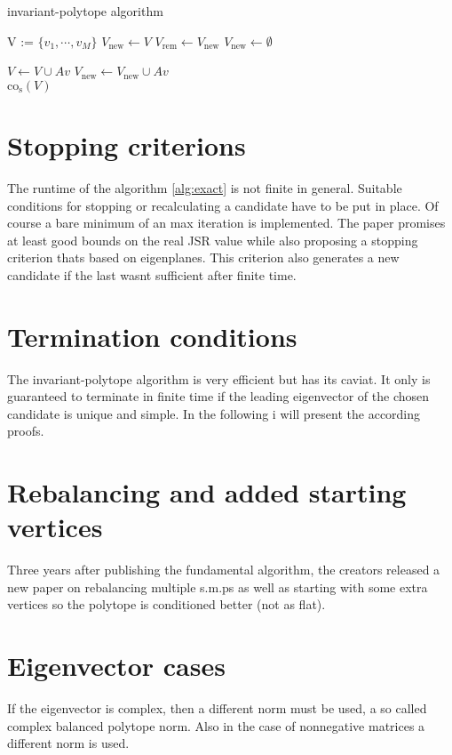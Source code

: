 \vspace{1cm}

\FloatBarrier

\begin{algorithm}
\caption{invariant-polytope algorithm}
\label{alg:exact}
\begin{algorithmic}

\State V := $\{v_1, \cdots, v_M\}$
\State $V_{\text{new}} \gets V$
\State $V_{\text{rem}} \gets V_{\text{new}}$
\State $V_{\text{new}} \gets \emptyset$

\State $V \gets V \cup Av$
\State $V_{\text{new}} \gets V_{\text{new}} \cup Av$
\EndIf
\EndFor
\EndFor
\EndWhile \\
\Return $\text{co}_{\text{s}}(V)$ \\
\end{algorithmic} 
\end{algorithm}

\FloatBarrier

\vspace{2cm}

\section{Stopping criterions}
The runtime of the algorithm \ref{alg:exact} is not finite in general. 
Suitable conditions for stopping or recalculating a candidate have to be put in place. 
Of course a bare minimum of an max iteration is implemented. 
The paper \citep{guglielmiExactComputationJoint2013} promises at least good bounds on the real JSR value while also proposing a stopping criterion thats based on eigenplanes. This criterion also generates a new candidate if the last wasnt sufficient after finite time.

\section{Termination conditions}
The invariant-polytope algorithm is very efficient but has its caviat. It only is guaranteed to terminate in finite time if the leading eigenvector of the chosen candidate is unique and simple. 
In the following i will present the according proofs. 

\section{Rebalancing and added starting vertices}
Three years after publishing the fundamental algorithm, the creators released a new paper on rebalancing multiple s.m.ps as well as starting with some extra vertices so the polytope is conditioned better (not as flat).

\section{Eigenvector cases}
If the eigenvector is complex, then a different norm must be used, a so called complex balanced polytope norm. 
Also in the case of nonnegative matrices a different norm is used. 



